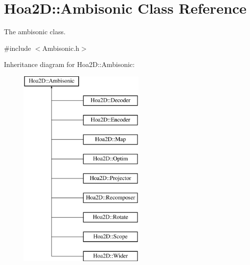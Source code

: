 \hypertarget{class_hoa2_d_1_1_ambisonic}{\section{Hoa2\-D\-:\-:Ambisonic Class Reference}
\label{class_hoa2_d_1_1_ambisonic}
}


The ambisonic class.  




{\ttfamily \#include $<$Ambisonic.\-h$>$}

Inheritance diagram for Hoa2\-D\-:\-:Ambisonic\-:\begin{figure}[H]
\begin{center}
\leavevmode
\includegraphics[height=10.000000cm]{class_hoa2_d_1_1_ambisonic}
\end{center}
\end{figure}
